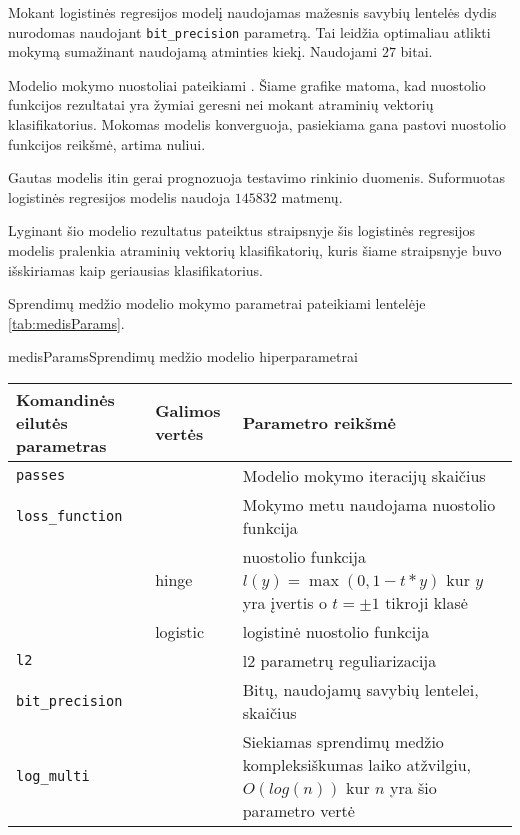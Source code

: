 Mokant logistinės regresijos modelį naudojamas mažesnis savybių lentelės dydis nurodomas naudojant \texttt{bit\_precision}
 parametrą. Tai leidžia optimaliau atlikti mokymą sumažinant naudojamą atminties kiekį. Naudojami $27$ bitai.

Modelio mokymo nuostoliai pateikiami . Šiame grafike
matoma, kad nuostolio funkcijos rezultatai yra žymiai geresni nei mokant atraminių vektorių klasifikatorius. Mokomas modelis konverguoja, pasiekiama gana pastovi nuostolio funkcijos reikšmė, artima nuliui.



Gautas modelis itin gerai prognozuoja testavimo rinkinio duomenis. Suformuotas logistinės regresijos modelis naudoja
$145832$ matmenų.


Lyginant šio modelio rezultatus pateiktus \cite{comp} straipsnyje šis logistinės regresijos modelis pralenkia
atraminių vektorių klasifikatorių, kuris šiame straipsnyje buvo išskiriamas kaip geriausias klasifikatorius.



Sprendimų medžio modelio mokymo parametrai pateikiami lentelėje \vref{tab:medisParams}.

\begin{ktutable}{medisParams}{Sprendimų medžio modelio hiperparametrai}
    \begin{tabular}{| l | l | p{7cm}|}
    \hline
        Komandinės eilutės parametras & Galimos vertės & Parametro reikšmė\\ \hline
        \texttt{passes} &  & Modelio mokymo iteracijų skaičius \\ \hline
        \texttt{loss\_function} &          & Mokymo metu naudojama nuostolio funkcija \\
                               & hinge    & nuostolio funkcija $l(y) = \max(0, 1 - t * y)$ kur $y$ yra įvertis o $t = \pm 1$ tikroji klasė  \\
                               & logistic & logistinė nuostolio funkcija \\ \hline
        \texttt{l2} & & l2 parametrų reguliarizacija \\ \hline
        \texttt{bit\_precision} & & Bitų, naudojamų savybių lentelei, skaičius\\ \hline
        \texttt{log\_multi} & & Siekiamas sprendimų medžio kompleksiškumas laiko atžvilgiu, $O(log(n))$ kur $n$ yra šio parametro vertė\\ \hline
    \end{tabular}
\end{ktutable}

